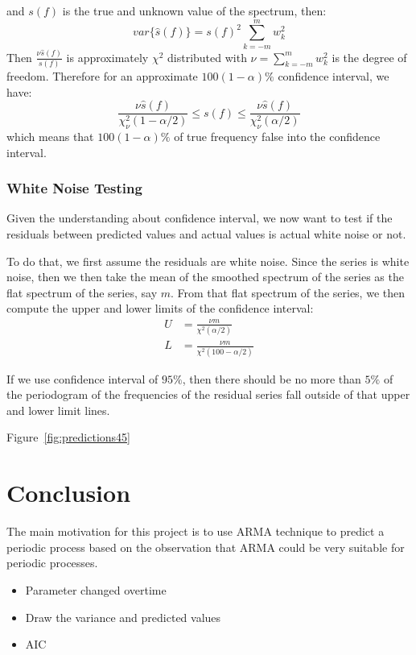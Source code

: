 \documentclass[12pt]{article}
\begin{document}
and $s(f)$ is the true and unknown value of the spectrum, then:
\begin{equation}
var\{\hat{s}(f)\}=s(f)^2\sum_{k=-m}^mw_k^2
\end{equation}
Then
$\frac{\nu \hat{s}(f)}{s(f)}$ is approximately $\chi^2$ distributed with
$\nu=\sum_{k=-m}^mw_k^2$ is the degree of freedom. Therefore for an approximate
$100(1-\alpha)\%$ confidence interval, we have:
\begin{equation}\label{eqn:confidenceInterval}
\frac{\nu\hat{s}(f)}{\chi_{\nu}^2(1-\alpha/2)}\leq s(f)\leq
\frac{\nu\hat{s}(f)}{\chi_{\nu}^2(\alpha/2)}
\end{equation}
which means that $100(1-\alpha)\%$ of true frequency false into the confidence
interval.
\subsubsection{White Noise Testing}
Given the understanding about confidence interval, we now want to test if the
residuals between predicted values and actual values is actual white noise or
not.

To do that, we first assume the residuals are white noise. Since the series is
white noise, then we then take the mean of the smoothed spectrum of the series
as the flat spectrum of the series, say $m$. From that flat spectrum of the
series, we then compute the upper and lower limits of the confidence interval:
\begin{align}
U &= \frac{\nu m}{\chi^2(\alpha/2)}\\
L &= \frac{\nu m}{\chi^2(100-\alpha/2)}
\end{align}

If we use confidence interval of $95\%$, then there should be no more than $5\%$
of the periodogram of the frequencies of the residual series fall outside of
that upper and lower limit lines.

Figure~\ref{fig:predictions45}



\section{Conclusion}
The main motivation for this project is to use ARMA technique to predict a
periodic process based on the observation that ARMA could be very suitable for
periodic processes.

\begin{itemize}
  \item Parameter changed overtime
  \item Draw the variance and predicted values
  \item AIC
\end{itemize}



\end{document}
